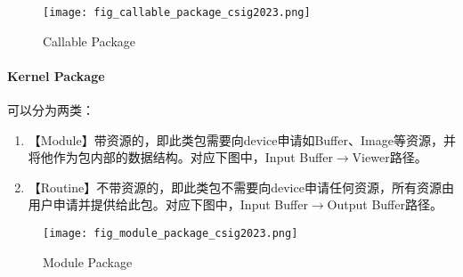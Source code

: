 \begin{figure}[H]
	\centering
	\texttt{[image: fig\_callable\_package\_csig2023.png]}
	\caption{Callable Package}
	\label{fig:CallablePackage}
\end{figure}

\paragraph{Kernel Package} 可以分为两类：
\begin{enumerate}
	\item 【Module】带资源的，即此类包需要向device申请如Buffer、Image等资源，并将他作为包内部的数据结构。对应下图中，Input Buffer$\rightarrow$Viewer路径。
	\item 【Routine】不带资源的，即此类包不需要向device申请任何资源，所有资源由用户申请并提供给此包。对应下图中，Input Buffer$\rightarrow$Output Buffer路径。
\end{enumerate}

\begin{figure}[H]
	\centering
	\texttt{[image: fig\_module\_package\_csig2023.png]}
	\caption{Module Package}
	\label{fig:Module Package}
\end{figure}